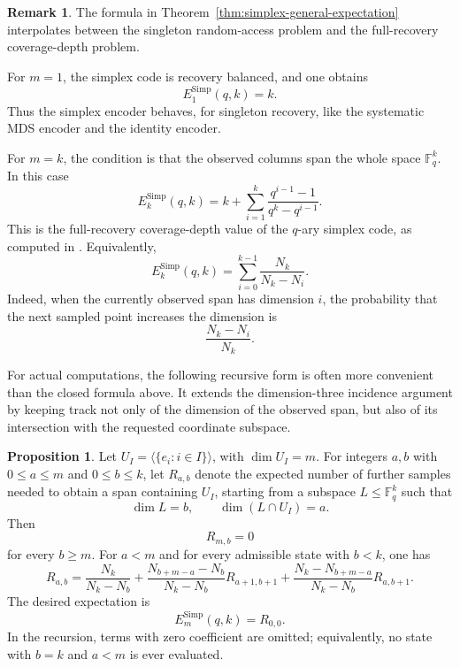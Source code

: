 \documentclass[11pt,a4paper]{article}
\numberwithin{equation}{section}
\theoremstyle{definition}
\newtheorem{remark}[definition]{Remark}
\theoremstyle{definition}
\newtheorem{proposition}[definition]{Proposition}
\newcommand{\F}{\mathbb{F}}
\newcommand{\Span}{\langle}
\begin{document}
\begin{remark}\label{rem:simplex-extremes}
The formula in Theorem~\ref{thm:simplex-general-expectation} interpolates between the singleton random-access problem and the full-recovery coverage-depth problem.

For $m=1$, the simplex code is recovery balanced, and one obtains
\[
E_1^{\mathrm{Simp}}(q,k)=k.
\]
Thus the simplex encoder behaves, for singleton recovery, like the systematic MDS encoder and the identity encoder.

For $m=k$, the condition is that the observed columns span the whole space $\F_q^k$.  In this case
\[
E_k^{\mathrm{Simp}}(q,k)
=
k+
\sum_{i=1}^{k}
\frac{q^{i-1}-1}{q^k-q^{i-1}}.
\]
This is the full-recovery coverage-depth value of the $q$-ary simplex code, as computed in \cite{bertuzzo2026duality}.  Equivalently,
\[
E_k^{\mathrm{Simp}}(q,k)
=
\sum_{i=0}^{k-1}
\frac{N_k}{N_k-N_i}.
\]
Indeed, when the currently observed span has dimension $i$, the probability that the next sampled point increases the dimension is
\[
\frac{N_k-N_i}{N_k}.
\]
\end{remark}

For actual computations, the following recursive form is often more convenient than the closed formula above.  It extends the dimension-three incidence argument by keeping track not only of the dimension of the observed span, but also of its intersection with the requested coordinate subspace.

\begin{proposition}\label{prop:simplex-recursion}
Let $U_I=\Span\{e_i:i\in I\}\rangle$, with $\dim U_I=m$.  For integers $a,b$ with $0\leq a\leq m$ and $0\leq b\leq k$, let $R_{a,b}$ denote the expected number of further samples needed to obtain a span containing $U_I$, starting from a subspace $L\leq \F_q^k$ such that
\[
\dim L=b,
\qquad
\dim(L\cap U_I)=a.
\]
Then
\[
R_{m,b}=0
\]
for every $b\geq m$.  For $a<m$ and for every admissible state with $b<k$, one has
\[
R_{a,b}
=
\frac{N_k}{N_k-N_b}
+
\frac{N_{b+m-a}-N_b}{N_k-N_b}R_{a+1,b+1}
+
\frac{N_k-N_{b+m-a}}{N_k-N_b}R_{a,b+1}.
\]
The desired expectation is
\[
E_m^{\mathrm{Simp}}(q,k)=R_{0,0}.
\]
In the recursion, terms with zero coefficient are omitted; equivalently, no
state with $b=k$ and $a<m$ is ever evaluated.
\end{proposition}
\end{document}
